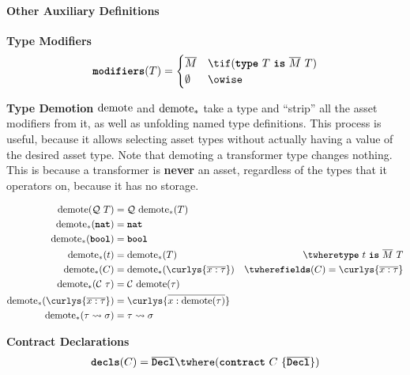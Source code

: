 \documentclass[dvipsnames, usenames, sigconf]{acmart}
\begin{document}
\paragraph{Other Auxiliary Definitions}

 \textbf{Type Modifiers}
\begin{align*}
    \modifiers(T) =
    \begin{cases}
        \overline{M} & \tif (\type~T~\is~\overline{M}~T) \\
        \emptyset & \owise
    \end{cases}
\end{align*}

\framebox{$\demote(\tau) = \sigma$}
 \textbf{Type Demotion}
$\text{demote}$ and $\text{demote}_*$ take a type and ``strip'' all the asset modifiers from it, as well as unfolding named type definitions.
This process is useful, because it allows selecting asset types without actually having a value of the desired asset type.
Note that demoting a transformer type changes nothing.
This is because a transformer is \textbf{never} an asset, regardless of the types that it operators on, because it has no storage.

\begin{align*}
    \demote(\mathcal{Q}~T) &= \mathcal{Q}~\demote_*(T) \\
    \demote_*(\natt) &= \natt \\
    \demote_*(\boolt) &= \boolt \\
    \demote_*(t) &= \demote_*(T) & \twhere \type~t~\is~\overline{M}~T \\
    \demote_*(C) &= \demote_*(\curlys{\overline{x : \tau}}) & \twhere \fields(C) = \curlys{\overline{x : \tau}} \\
    \demote_*(\mathcal{C}~\tau) &= \mathcal{C}~\demote(\tau) \\
    \demote_*(\curlys{\overline{x : \tau}}) &= \curlys{\overline{x : \demote(\tau)}} \\
    \demote_*(\tau \transforms \sigma) &= \tau \transforms \sigma
\end{align*}

 \textbf{Contract Declarations}
\begin{align*}
    \decls(C) = \overline{\Decl} \twhere (\contract~C~\{ \overline{\Decl} \})
\end{align*}
\end{document}
